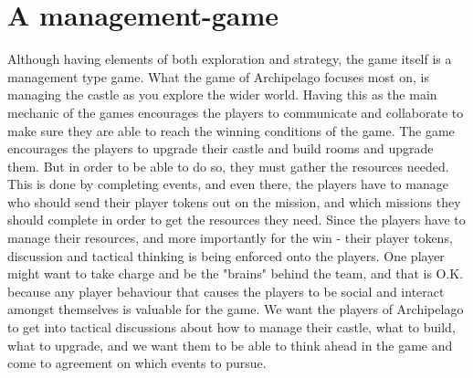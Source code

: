 \section{A management-game}
\label{sec:management}
Although having elements of both exploration and strategy, the game itself is a management type game. What the game of Archipelago focuses most on, is managing the castle as you explore the wider world. Having this as the main mechanic of the games encourages the players to communicate and collaborate to make sure they are able to reach the winning conditions of the game. The game encourages the players to upgrade their castle and build rooms and upgrade them. But in order to be able to do so, they must gather the resources needed. This is done by completing events, and even there, the players have to manage who should send their player tokens out on the mission, and which missions they should complete in order to get the resources they need. Since the players have to manage their resources, and more importantly for the win - their player tokens, discussion and tactical thinking is being enforced onto the players. One player might want to take charge and be the "brains" behind the team, and that is O.K. because any player behaviour that causes the players to be social and interact amongst themselves is valuable for the game. We want the players of Archipelago to get into tactical discussions about how to manage their castle, what to build, what to upgrade, and we want them to be able to think ahead in the game and come to agreement on which events to pursue. 

